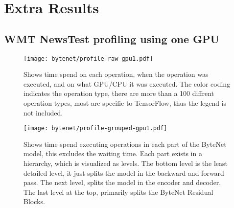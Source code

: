 \chapter{Extra Results}

\section{WMT NewsTest profiling using one GPU}
\label{appendix:result:bytenet-profile}

\begin{figure}[h]
    \centering
    \texttt{[image: bytenet/profile-raw-gpu1.pdf]}
    \caption{Shows time spend on each operation, when the operation was executed, and on what GPU/CPU it was executed. The color coding indicates the operation type, there are more than a 100 diffrent operation types, most are specific to TensorFlow, thus the legend is not included.}
\end{figure}

\begin{figure}[h]
    \centering
    \texttt{[image: bytenet/profile-grouped-gpu1.pdf]}
    \caption{Shows time spend executing operations in each part of the ByteNet model, this excludes the waiting time. Each part exists in a hierarchy, which is visualized as levels. The bottom level is the least detailed level, it just splits the model in the backward and forward pass. The next level, splits the model in the encoder and decoder. The last level at the top, primarily splits the ByteNet Residual Blocks.}
\end{figure}
